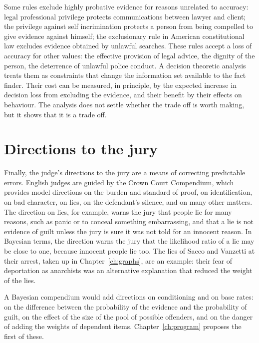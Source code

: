 Some rules exclude highly probative evidence for reasons unrelated to accuracy: legal professional privilege protects communications between lawyer and client; the privilege against self incrimination protects a person from being compelled to give evidence against himself; the exclusionary rule in American constitutional law excludes evidence obtained by unlawful searches. These rules accept a loss of accuracy for other values: the effective provision of legal advice, the dignity of the person, the deterrence of unlawful police conduct. A decision theoretic analysis treats them as constraints that change the information set available to the fact finder. Their cost can be measured, in principle, by the expected increase in decision loss from excluding the evidence, and their benefit by their effects on behaviour. The analysis does not settle whether the trade off is worth making, but it shows that it is a trade off.

\section{Directions to the jury}

Finally, the judge's directions to the jury are a means of correcting predictable errors. English judges are guided by the Crown Court Compendium, which provides model directions on the burden and standard of proof, on identification, on bad character, on lies, on the defendant's silence, and on many other matters. The direction on lies, for example, warns the jury that people lie for many reasons, such as panic or to conceal something embarrassing, and that a lie is not evidence of guilt unless the jury is sure it was not told for an innocent reason. In Bayesian terms, the direction warns the jury that the likelihood ratio of a lie may be close to one, because innocent people lie too. The lies of Sacco and Vanzetti at their arrest, taken up in Chapter~\ref{ch:graphs}, are an example: their fear of deportation as anarchists was an alternative explanation that reduced the weight of the lies.

A Bayesian compendium would add directions on conditioning and on base rates: on the difference between the probability of the evidence and the probability of guilt, on the effect of the size of the pool of possible offenders, and on the danger of adding the weights of dependent items. Chapter~\ref{ch:program} proposes the first of these.

